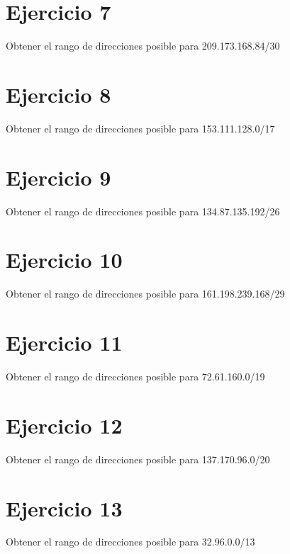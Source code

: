 \documentclass[letterpaper,10pt,spanish]{sphinxmanual}
\begin{document}
\section{Ejercicio 7}
\label{\detokenize{t2_integracion_elementos/ejercicios_subredes_ipv4/rangos_direcciones:ejercicio-7}}
\sphinxAtStartPar
Obtener el rango de direcciones posible para 209.173.168.84/30


\section{Ejercicio 8}
\label{\detokenize{t2_integracion_elementos/ejercicios_subredes_ipv4/rangos_direcciones:ejercicio-8}}
\sphinxAtStartPar
Obtener el rango de direcciones posible para 153.111.128.0/17


\section{Ejercicio 9}
\label{\detokenize{t2_integracion_elementos/ejercicios_subredes_ipv4/rangos_direcciones:ejercicio-9}}
\sphinxAtStartPar
Obtener el rango de direcciones posible para 134.87.135.192/26


\section{Ejercicio 10}
\label{\detokenize{t2_integracion_elementos/ejercicios_subredes_ipv4/rangos_direcciones:ejercicio-10}}
\sphinxAtStartPar
Obtener el rango de direcciones posible para 161.198.239.168/29


\section{Ejercicio 11}
\label{\detokenize{t2_integracion_elementos/ejercicios_subredes_ipv4/rangos_direcciones:ejercicio-11}}
\sphinxAtStartPar
Obtener el rango de direcciones posible para 72.61.160.0/19


\section{Ejercicio 12}
\label{\detokenize{t2_integracion_elementos/ejercicios_subredes_ipv4/rangos_direcciones:ejercicio-12}}
\sphinxAtStartPar
Obtener el rango de direcciones posible para 137.170.96.0/20


\section{Ejercicio 13}
\label{\detokenize{t2_integracion_elementos/ejercicios_subredes_ipv4/rangos_direcciones:ejercicio-13}}
\sphinxAtStartPar
Obtener el rango de direcciones posible para 32.96.0.0/13
\end{document}
